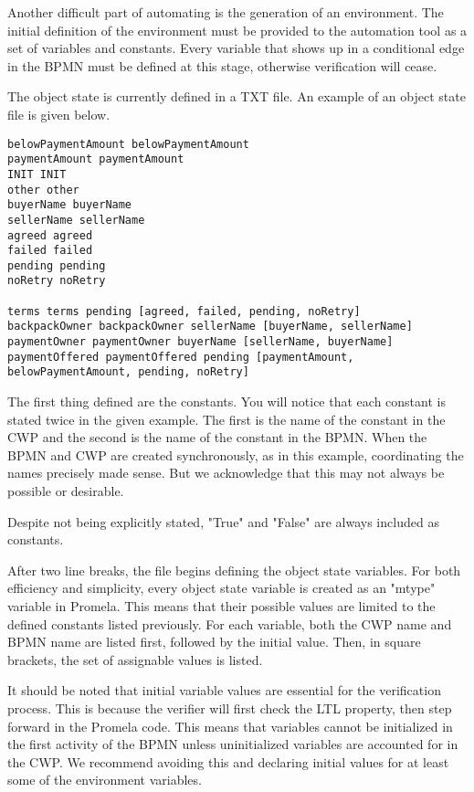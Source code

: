Another difficult part of automating is the generation of an environment. The initial definition of the environment must be provided to the automation tool as a set of variables and constants. Every variable that shows up in a conditional edge in the BPMN must be defined at this stage, otherwise verification will cease.

The object state is currently defined in a TXT file. An example of an object state file is given below.
%
{\small
\begin{lstlisting}[style=myTXT]
belowPaymentAmount belowPaymentAmount
paymentAmount paymentAmount
INIT INIT
other other
buyerName buyerName
sellerName sellerName
agreed agreed
failed failed
pending pending
noRetry noRetry

terms terms pending [agreed, failed, pending, noRetry]
backpackOwner backpackOwner sellerName [buyerName, sellerName]
paymentOwner paymentOwner buyerName [sellerName, buyerName]
paymentOffered paymentOffered pending [paymentAmount, belowPaymentAmount, pending, noRetry]
\end{lstlisting}
}
%
The first thing defined are the constants. You will notice that each constant is stated twice in the given example. The first is the name of the constant in the CWP and the second is the name of the constant in the BPMN. When the BPMN and CWP are created synchronously, as in this example, coordinating the names precisely made sense. But we acknowledge that this may not always be possible or desirable.

Despite not being explicitly stated, "True" and "False" are always included as constants. 

After two line breaks, the file begins defining the object state variables. For both efficiency and simplicity, every object state variable is created as an "mtype" variable in Promela. This means that their possible values are limited to the defined constants listed previously. For each variable, both the CWP name and BPMN name are listed first, followed by the initial value. Then, in square brackets, the set of assignable values is listed.

It should be noted that initial variable values are essential for the verification process. This is because the verifier will first check the LTL property, then step forward in the Promela code. This means that variables cannot be initialized in the first activity of the BPMN unless uninitialized variables are accounted for in the CWP. We recommend avoiding this and declaring initial values for at least some of the environment variables.

